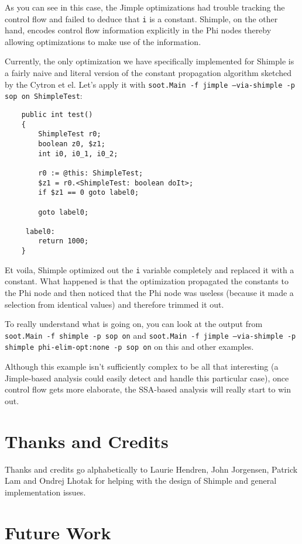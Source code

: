 \documentclass[10pt,letterpaper,oneside,onecolumn]{article}
\begin{document}
As you can see in this case, the Jimple optimizations had trouble
tracking the control flow and failed to deduce that {\tt i} is a
constant.  Shimple, on the other hand, encodes control flow
information explicitly in the Phi nodes thereby allowing optimizations
to make use of the information.

Currently, the only optimization we have specifically implemented for
Shimple is a fairly naive and literal version of the constant
propagation algorithm sketched by the Cytron et el.  Let's apply it
with {\tt soot.Main -f jimple --via-shimple -p sop on ShimpleTest}:

\begin{verbatim}
    public int test()
    {
        ShimpleTest r0;
        boolean z0, $z1;
        int i0, i0_1, i0_2;

        r0 := @this: ShimpleTest;
        $z1 = r0.<ShimpleTest: boolean doIt>;
        if $z1 == 0 goto label0;

        goto label0;

     label0:
        return 1000;
    }
\end{verbatim}

Et voila, Shimple optimized out the {\tt i} variable completely and
replaced it with a constant.  What happened is that the optimization
propagated the constants to the Phi node and then noticed that the
Phi node was useless (because it made a selection from identical
values) and therefore trimmed it out.

To really understand what is going on, you can look at the output from
{\tt soot.Main -f shimple -p sop on} and {\tt soot.Main -f jimple
--via-shimple -p shimple phi-elim-opt:none -p sop on} on this and
other examples.

Although this example isn't sufficiently complex to be all that
interesting (a Jimple-based analysis could easily detect and handle
this particular case), once control flow gets more elaborate, the
SSA-based analysis will really start to win out.

\section{Thanks and Credits}

Thanks and credits go alphabetically to Laurie Hendren, John
Jorgensen, Patrick Lam and Ondrej Lhotak for helping with the design
of Shimple and general implementation issues.

\section{Future Work}
\end{document}
